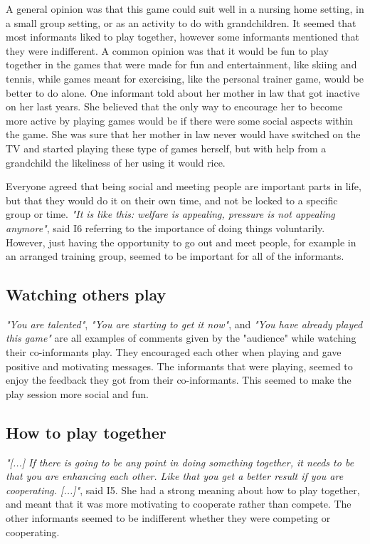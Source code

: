 A general opinion was that this game could suit well in a nursing home setting, in a small group setting, or as an activity to do with grandchildren. It seemed that most informants liked to play together, however some informants mentioned that they were indifferent. A common opinion was that it would be fun to play together in the games that were made for fun and entertainment, like skiing and tennis, while games meant for exercising, like the personal trainer game, would be better to do alone. One informant told about her mother in law that got inactive on her last years. She believed that the only way to encourage her to become more active by playing games would be if there were some social aspects within the game. She was sure that her mother in law never would have switched on the TV and started playing these type of games herself, but with help from a grandchild the likeliness of her using it would rice. 

Everyone agreed that being social and meeting people are important parts in life, but that they would do it on their own time, and not be locked to a specific group or time. \emph{"It is like this: welfare is appealing, pressure is not appealing anymore"}, said I6 referring to the importance of doing things voluntarily. However, just having the opportunity to go out and meet people, for example in an arranged training group, seemed to be important for all of the informants. 

\subsection{Watching others play}
\emph{"You are talented"}, \emph{"You are starting to get it now"}, and \emph{"You have already played this game"} are all examples of comments given by the "audience" while watching their co-informants play. They encouraged each other when playing and gave positive and motivating messages. The informants that were playing, seemed to enjoy the feedback they got from their co-informants. This seemed to make the play session more social and fun.  

\subsection{How to play together}
\emph{"[...] If there is going to be any point in doing something together, it needs to be that you are enhancing each other. Like that you get a better result if you are cooperating. [...]"}, said I5. She had a strong meaning about how to play together, and meant that it was more motivating to cooperate rather than compete. The other informants seemed to be indifferent whether they were competing or cooperating.

